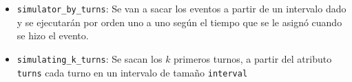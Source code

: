 \begin{itemize}
\begin{itemize}
 \item \verb|simulator_by_turns|: Se van a sacar los eventos a partir de un intervalo dado y se ejecutar\'an por orden uno a uno seg\'un el tiempo que se le asign\'o cuando se hizo el evento.
 
 
 \item \verb|simulating_k_turns|: Se sacan los $k$ primeros turnos, a partir del atributo \verb|turns| cada turno en un intervalo de tama\~no \verb|interval|
 \end{itemize}
 
\end{itemize}


